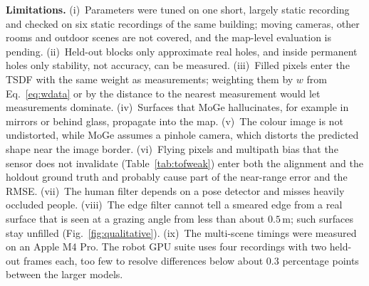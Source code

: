 \documentclass[conference]{IEEEtran}
\begin{document}
\textbf{Limitations.}
(i)~Parameters were tuned on one short, largely static recording and checked
on six static recordings of the same building; moving cameras, other rooms
and outdoor scenes are not covered, and the map-level evaluation is pending.
(ii)~Held-out blocks only approximate real holes, and inside permanent holes
only stability, not accuracy, can be measured.
(iii)~Filled pixels enter the TSDF with the same weight as measurements;
weighting them by \(w\) from Eq.~\eqref{eq:wdata} or by the distance to the
nearest measurement would let measurements dominate.
(iv)~Surfaces that MoGe hallucinates, for example in mirrors or behind glass,
propagate into the map.
(v)~The colour image is not undistorted, while MoGe assumes a pinhole camera,
which distorts the predicted shape near the image border.
(vi)~Flying pixels and multipath bias that the sensor does not invalidate
(Table~\ref{tab:tofweak}) enter both the alignment and the holdout ground truth
and probably cause part of the near-range error and the RMSE.
(vii)~The human filter depends on a pose detector and misses heavily occluded
people.
(viii)~The edge filter cannot tell a smeared edge from a real surface that is
seen at a grazing angle from less than about \(0.5\,\)m; such surfaces stay
unfilled (Fig.~\ref{fig:qualitative}).
(ix)~The multi-scene timings were measured on an Apple M4 Pro. The robot GPU
suite uses four recordings with two held-out frames each, too few to resolve
differences below about \(0.3\) percentage points between the larger models.

\end{document}
